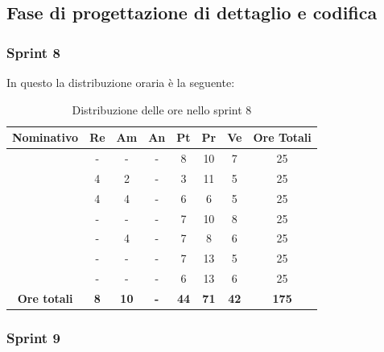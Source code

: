 \subsection{Fase di progettazione di dettaglio e codifica}

\subsubsection{Sprint 8}

In questo  la distribuzione oraria è la seguente:
\begin{table}[H]
		\begin{center}
			\setlength{\aboverulesep}{0pt}
			\setlength{\belowrulesep}{0pt}
			\setlength{\extrarowheight}{.75ex}
			\begin{tabular}{ c c c c c c c c }
				\rowcolor{AzzurroGruppo!30} 
				\textbf{Nominativo} & \textbf{Re} & \textbf{Am} & \textbf{An} & \textbf{Pt} & \textbf{Pr} & \textbf{Ve} & \textbf{Ore Totali}  \\
				\toprule
				\Davide    & - & - & - & 8 & 10 & 7 & 25 \\
				\Giosue    & 4 & 2 & - & 3 & 11 & 5 & 25 \\
				\Francesco & 4 & 4 & - & 6 & 6 & 5 & 25 \\
				\Daniele   & - & - & - & 7 & 10 & 8 & 25 \\
				\Lucrezia  & - & 4 & - & 7 & 8 & 6 & 25 \\
				\Matteo    & - & - & - & 7 & 13 & 5 & 25 \\
				\Tommaso   & - & - & - & 6 & 13 & 6 & 25 \\
				 \textbf{Ore totali} & \textbf{8} & \textbf{10} & \textbf{-} & \textbf{44} & \textbf{71} & \textbf{42} & \textbf{175} \\
				\bottomrule
			\end{tabular}
			\caption{Distribuzione delle ore nello sprint 8}
		\end{center}
	\end{table}


\subsubsection{Sprint 9}

